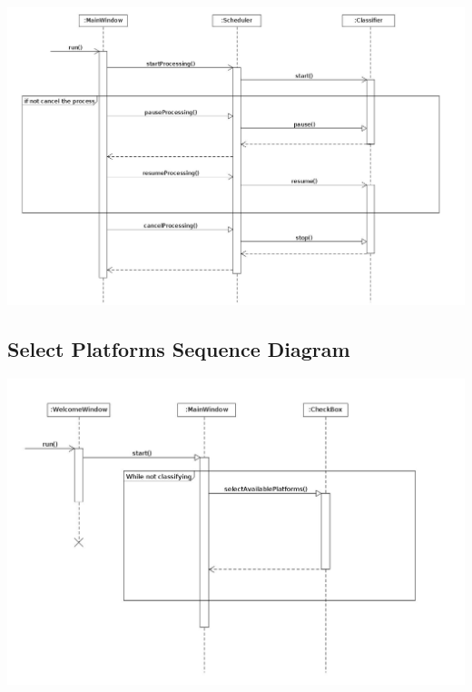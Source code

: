 \documentclass[parskip=full]{scrartcl}
\begin{document}
\begin{center}
\includegraphics[angle=90,origin=c,height=1.0\textwidth]{Classification.jpg}
\end{center}

\pagebreak

\subsection {Select Platforms Sequence Diagram}

\begin{center}
\includegraphics[angle=90,origin=c,height=1.0\textwidth]{SelectPlatforms.jpg}
\end{center}
\end{document}
